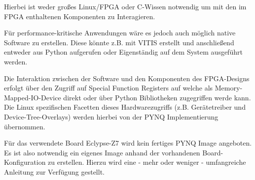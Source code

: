 Hierbei ist weder großes Linux/\acs{FPGA} oder C-Wissen notwendig um mit den im \acs{FPGA} enthaltenen Komponenten zu Interagieren.

Für performance-kritische Anwendungen wäre es jedoch auch möglich native Software zu erstellen.
Diese könnte z.B. mit VITIS erstellt und anschließend entweder aus Python aufgerufen oder Eigenständig auf dem System ausgeführt werden.

Die Interaktion zwischen der Software und den Komponenten des \acs{FPGA}-Designs erfolgt über den Zugriff auf Special Function Registers auf welche als Memory-Mapped-IO-Device direkt
oder über Python Bibliotheken zugegriffen werde kann. 
Die Linux spezifischen Facetten dieses Hardwarezugriffs (z.B. Gerätetreiber und Device-Tree-Overlays) werden hierbei von der \acs{PYNQ} Implementierung übernommen.

Für das verwendete Board Eclypse-Z7 wird kein fertiges \acs{PYNQ} Image angeboten. Es ist also notwendig ein eigenes Image anhand der vorhandenen Board-Konfiguration zu erstellen.
Hierzu wird eine - mehr oder weniger - umfangreiche Anleitung zur Verfügung gestellt. \cite{PYNQ_SD_CARD}
